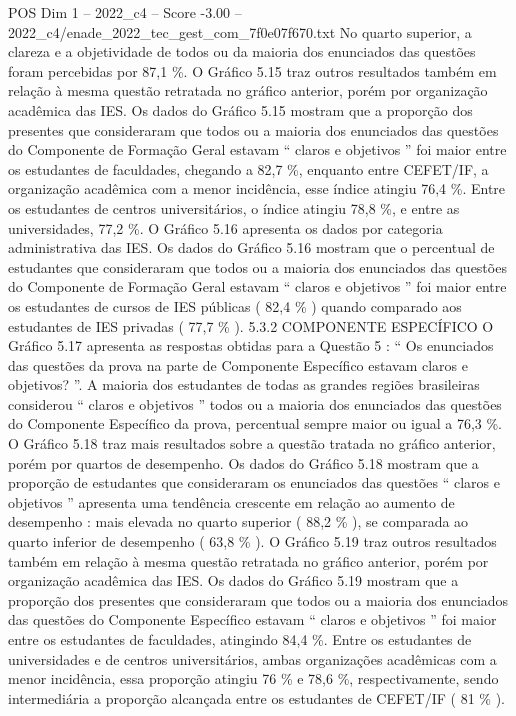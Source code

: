 \begin{textsample}{POS Dim 1 – 2022\_c4 – Score -3.00 – 2022\_c4/enade\_2022\_tec\_gest\_com\_7f0e07f670.txt}
No quarto superior, a clareza e a objetividade de todos ou da maioria dos enunciados das questões foram percebidas por 87,1 \%.
O Gráfico 5.15 traz outros resultados também em relação à mesma questão retratada no gráfico anterior, porém por organização acadêmica das IES.
Os dados do Gráfico 5.15 mostram que a proporção dos presentes que consideraram que todos ou a maioria dos enunciados das questões do Componente de Formação Geral estavam “ claros e objetivos ” foi maior entre os estudantes de faculdades, chegando a 82,7 \%, enquanto entre CEFET/IF, a organização acadêmica com a menor incidência, esse índice atingiu 76,4 \%.
Entre os estudantes de centros universitários, o índice atingiu 78,8 \%, e entre as universidades, 77,2 \%.
O Gráfico 5.16 apresenta os dados por categoria administrativa das IES.
Os dados do Gráfico 5.16 mostram que o percentual de estudantes que consideraram que todos ou a maioria dos enunciados das questões do Componente de Formação Geral estavam “ claros e objetivos ” foi maior entre os estudantes de cursos de IES públicas ( 82,4 \% ) quando comparado aos estudantes de IES privadas ( 77,7 \% ). 5.3.2 COMPONENTE ESPECÍFICO O Gráfico 5.17 apresenta as respostas obtidas para a Questão 5 : “ Os enunciados das questões da prova na parte de Componente Específico estavam claros e objetivos? ”.
A maioria dos estudantes de todas as grandes regiões brasileiras considerou “ claros e objetivos ” todos ou a maioria dos enunciados das questões do Componente Específico da prova, percentual sempre maior ou igual a 76,3 \%.
O Gráfico 5.18 traz mais resultados sobre a questão tratada no gráfico anterior, porém por quartos de desempenho.
Os dados do Gráfico 5.18 mostram que a proporção de estudantes que consideraram os enunciados das questões “ claros e objetivos ” apresenta uma tendência crescente em relação ao aumento de desempenho : mais elevada no quarto superior ( 88,2 \% ), se comparada ao quarto inferior de desempenho ( 63,8 \% ).
O Gráfico 5.19 traz outros resultados também em relação à mesma questão retratada no gráfico anterior, porém por organização acadêmica das IES.
Os dados do Gráfico 5.19 mostram que a proporção dos presentes que consideraram que todos ou a maioria dos enunciados das questões do Componente Específico estavam “ claros e objetivos ” foi maior entre os estudantes de faculdades, atingindo 84,4 \%.
Entre os estudantes de universidades e de centros universitários, ambas organizações acadêmicas com a menor incidência, essa proporção atingiu 76 \% e 78,6 \%, respectivamente, sendo intermediária a proporção alcançada entre os estudantes de CEFET/IF ( 81 \% ).

\end{textsample}
